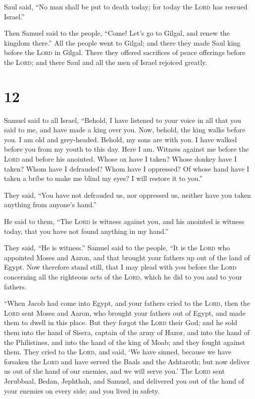 Saul said, ``No man shall be put to death today; for
today the \textsc{Lord} has rescued Israel.''

 Then Samuel said to the people, ``Come! Let's go to
Gilgal, and renew the kingdom there.''  All the people
went to Gilgal; and there they made Saul king before the \textsc{Lord}
in Gilgal. There they offered sacrifices of peace offerings before the
\textsc{Lord}; and there Saul and all the men of Israel rejoiced
greatly.

\hypertarget{section-11}{%
\section{12}\label{section-11}}

 Samuel said to all Israel, ``Behold, I have listened to
your voice in all that you said to me, and have made a king over you.
 Now, behold, the king walks before you. I am old and
grey-headed. Behold, my sons are with you. I have walked before you from
my youth to this day.  Here I am. Witness against me
before the \textsc{Lord} and before his anointed. Whose ox have I taken?
Whose donkey have I taken? Whom have I defrauded? Whom have I oppressed?
Of whose hand have I taken a bribe to make me blind my eyes? I will
restore it to you.''

 They said, ``You have not defrauded us, nor oppressed us,
neither have you taken anything from anyone's hand.''

 He said to them, ``The \textsc{Lord} is witness against
you, and his anointed is witness today, that you have not found anything
in my hand.''

They said, ``He is witness.''  Samuel said to the people,
``It is the \textsc{Lord} who appointed Moses and Aaron, and that
brought your fathers up out of the land of Egypt.  Now
therefore stand still, that I may plead with you before the
\textsc{Lord} concerning all the righteous acts of the \textsc{Lord},
which he did to you and to your fathers.

 ``When Jacob had come into Egypt, and your fathers cried
to the \textsc{Lord}, then the \textsc{Lord} sent Moses and Aaron, who
brought your fathers out of Egypt, and made them to dwell in this place.
 But they forgot the \textsc{Lord} their God; and he sold
them into the hand of Sisera, captain of the army of Hazor, and into the
hand of the Philistines, and into the hand of the king of Moab; and they
fought against them.  They cried to the \textsc{Lord},
and said, `We have sinned, because we have forsaken the \textsc{Lord}
and have served the Baals and the Ashtaroth; but now deliver us out of
the hand of our enemies, and we will serve you.'  The
\textsc{Lord} sent Jerubbaal, Bedan, Jephthah, and Samuel, and delivered
you out of the hand of your enemies on every side; and you lived in
safety.

